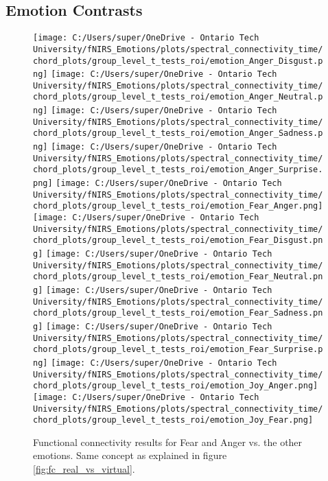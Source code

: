 \subsection{Emotion Contrasts}
\begin{figure}[H]
  \centering
  \texttt{[image: C:/Users/super/OneDrive - Ontario Tech University/fNIRS\_Emotions/plots/spectral\_connectivity\_time/chord\_plots/group\_level\_t\_tests\_roi/emotion\_Anger\_Disgust.png]}
  \texttt{[image: C:/Users/super/OneDrive - Ontario Tech University/fNIRS\_Emotions/plots/spectral\_connectivity\_time/chord\_plots/group\_level\_t\_tests\_roi/emotion\_Anger\_Neutral.png]}
  \texttt{[image: C:/Users/super/OneDrive - Ontario Tech University/fNIRS\_Emotions/plots/spectral\_connectivity\_time/chord\_plots/group\_level\_t\_tests\_roi/emotion\_Anger\_Sadness.png]}
  \texttt{[image: C:/Users/super/OneDrive - Ontario Tech University/fNIRS\_Emotions/plots/spectral\_connectivity\_time/chord\_plots/group\_level\_t\_tests\_roi/emotion\_Anger\_Surprise.png]}
  \texttt{[image: C:/Users/super/OneDrive - Ontario Tech University/fNIRS\_Emotions/plots/spectral\_connectivity\_time/chord\_plots/group\_level\_t\_tests\_roi/emotion\_Fear\_Anger.png]}
  \texttt{[image: C:/Users/super/OneDrive - Ontario Tech University/fNIRS\_Emotions/plots/spectral\_connectivity\_time/chord\_plots/group\_level\_t\_tests\_roi/emotion\_Fear\_Disgust.png]}
  \texttt{[image: C:/Users/super/OneDrive - Ontario Tech University/fNIRS\_Emotions/plots/spectral\_connectivity\_time/chord\_plots/group\_level\_t\_tests\_roi/emotion\_Fear\_Neutral.png]}
  \texttt{[image: C:/Users/super/OneDrive - Ontario Tech University/fNIRS\_Emotions/plots/spectral\_connectivity\_time/chord\_plots/group\_level\_t\_tests\_roi/emotion\_Fear\_Sadness.png]}
  \texttt{[image: C:/Users/super/OneDrive - Ontario Tech University/fNIRS\_Emotions/plots/spectral\_connectivity\_time/chord\_plots/group\_level\_t\_tests\_roi/emotion\_Fear\_Surprise.png]}
  \texttt{[image: C:/Users/super/OneDrive - Ontario Tech University/fNIRS\_Emotions/plots/spectral\_connectivity\_time/chord\_plots/group\_level\_t\_tests\_roi/emotion\_Joy\_Anger.png]}
  \texttt{[image: C:/Users/super/OneDrive - Ontario Tech University/fNIRS\_Emotions/plots/spectral\_connectivity\_time/chord\_plots/group\_level\_t\_tests\_roi/emotion\_Joy\_Fear.png]}
  \caption[FC: Emotion Contrasts (Fear and Anger)]{Functional connectivity results for Fear and Anger vs. the other emotions.
  Same concept as explained in figure \ref{fig:fc_real_vs_virtual}. }
  \label{fig:fc_emotion_analysis}
\end{figure}


